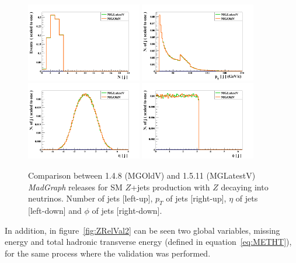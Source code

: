 \begin{figure}[!Hhtbp]
  \begin{center}
    \includegraphics[width=0.45\textwidth]{figs/ZjetsRelVal0.png}
    \includegraphics[width=0.45\textwidth]{figs/ZjetsRelVal1.png}
    \includegraphics[width=0.45\textwidth]{figs/ZjetsRelVal2.png}
    \includegraphics[width=0.45\textwidth]{figs/ZjetsRelVal3.png}
    \caption{Comparison between 1.4.8 (MGOldV) and 1.5.11 (MGLatestV) \textit{MadGraph} releases for SM $Z$+jets production with $Z$ decaying into neutrinos. Number of jets [left-up], $p_{T}$ of jets [right-up], $\eta$ of jets [left-down] and $\phi$ of jets [right-down].}
    \label{fig:ZRelVal1}
  \end{center}
\end{figure}

In addition, in figure~\ref{fig:ZRelVal2} can be seen two global variables, missing energy and total hadronic transverse energy (defined in equation~\ref{eq:METHT}), for the same process where the validation was performed.

